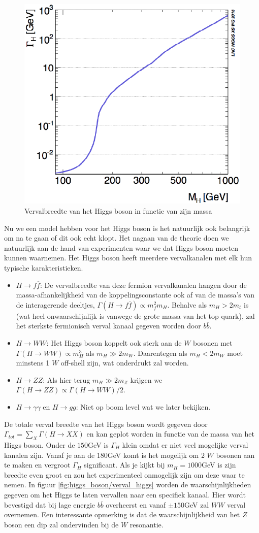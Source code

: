 \documentclass[../main.tex]{subfiles}
\begin{document}
\begin{figure}[h]
    \centering
    \includegraphics[width=0.5\linewidth]{higgs_boson/verval_breedte_higgs.png}
    \caption{Vervalbreedte van het Higgs boson in functie van zijn massa}%
    \label{fig:higgs_boson/verval_breedte_higgs}
\end{figure}

Nu we een model hebben voor het Higgs boson is het natuurlijk ook belangrijk om na te gaan of dit ook echt klopt. Het nagaan van de theorie doen we natuurlijk aan de hand van experimenten waar we dat Higgs boson moeten kunnen waarnemen. Het Higgs boson heeft meerdere vervalkanalen met elk hun typische karakteristieken.
\begin{itemize}
    \item $H\rightarrow f\overline f$: De vervalbreedte van deze fermion vervalkanalen hangen door de massa-afhankelijkheid van de koppelingsconstante ook af van de massa's van de interagerende deeltjes, $\Gamma(H\rightarrow f\overline f) \propto m_f^2m_H$. Behalve als $m_H > 2m_t$ is (wat heel onwaarschijnlijk is vanwege de grote massa van het top quark), zal het sterkste fermionisch verval kanaal gegeven worden door $b\overline b$.
    \item $H\rightarrow WW$: Het Higgs boson koppelt ook sterk aan de $W$ bosonen met $\Gamma(H\rightarrow WW)\propto m_H^3$ als $m_H \gg 2m_W$. Daarentegen als $m_H < 2m_W$ moet minstens 1 $W$ off-shell zijn, wat onderdrukt zal worden.
    \item $H\rightarrow ZZ$: Als hier terug $m_H \gg 2m_Z$ krijgen we $\Gamma(H\rightarrow ZZ)\propto \Gamma(H\rightarrow WW)/2$.
    \item $H\rightarrow \gamma\gamma$ en $H \rightarrow gg$: Niet op boom level wat we later bekijken.
\end{itemize}
De totale verval breedte van het Higgs boson wordt gegeven door $\Gamma_{tot} = \sum_X \Gamma(H\rightarrow XX)$ en kan geplot worden in functie van de massa van het Higgs boson. Onder de $150$GeV is $\Gamma_H$ klein omdat er niet veel mogelijke verval kanalen zijn. Vanaf je aan de $180$GeV komt is het mogelijk om 2 $W$ bosonen aan te maken en vergroot $\Gamma_H$  significant. Als je kijkt bij $m_H=1000$GeV is zijn breedte even groot en zou het experimenteel onmogelijk zijn om deze waar te nemen. In figuur \ref{fig:higgs_boson/verval_higgs} worden de waarschijnlijkheden gegeven om het Higgs te laten vervallen naar een specifiek kanaal. Hier wordt bevestigd dat bij lage energie $b\overline b$ overheerst en vanaf $\pm 150$GeV zal $WW$ verval overnemen. Een interessante opmerking is dat de waarschijnlijkheid van het $Z$ boson een dip zal ondervinden bij de $W$ resonantie.
\end{document}
